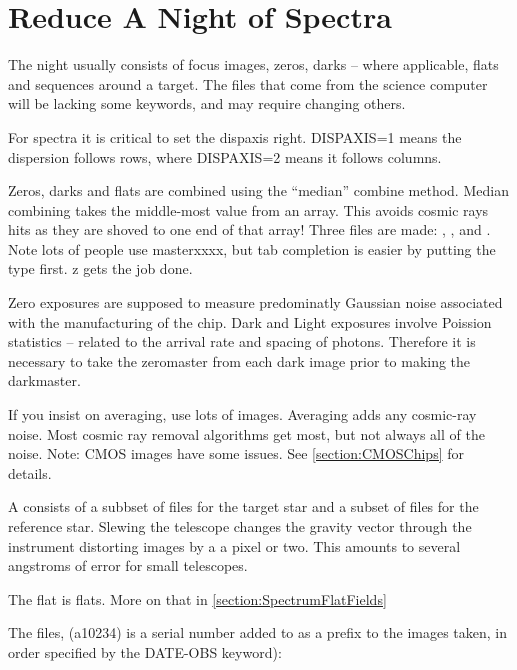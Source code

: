 \renewcommand{\footerfilename}{ReduceSpectra.tex}

\section{Reduce A Night of Spectra}

The night usually consists of focus images, zeros, darks -- where applicable, flats
and sequences around a target. The files that come from the science computer will
be lacking some keywords, and may require changing others.

For spectra it is critical to set the \gls{dispaxis} right. DISPAXIS=1 means the
dispersion follows rows, where DISPAXIS=2 means it follows columns. 

Zeros, darks and flats are combined using the ``median'' combine
method. Median combining takes the middle-most value from an array. This
avoids cosmic rays hits as they are shoved to one end of that array!
Three files are made: , , and
. Note lots of people use masterxxxx, but tab completion
is easier by putting the type first. z gets the job done.

Zero exposures are supposed to measure predominatly Gaussian noise associated
with the manufacturing of the chip.  Dark and Light exposures involve Poission
statistics -- related to the arrival rate and spacing of photons. Therefore
it is necessary to take the zeromaster from each dark image prior to making
the darkmaster.

If you insist on averaging, use lots of images. Averaging adds any
cosmic-ray noise. Most cosmic ray removal algorithms get most, but not
always all of the noise. Note: CMOS images have some issues. See
\ref{section:CMOSChips} for details.

A  consists of a subbset of files for the target star and a subset
of files for the reference star. Slewing the telescope changes the gravity
vector through the instrument distorting images by a a pixel or two. This
amounts to several angstroms of error for small telescopes.

The flat is  flats. More on that in
\ref{section:SpectrumFlatFields}


The files, (a10234) is a serial number added to as a prefix to the images
taken, in order specified by the DATE-OBS keyword):

    \\
    \\

